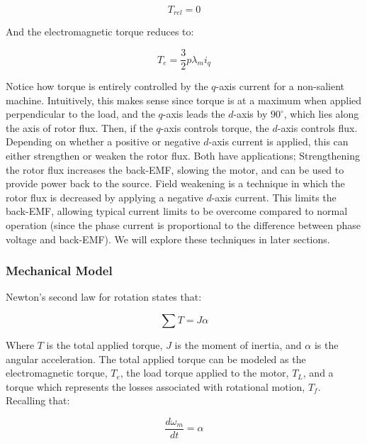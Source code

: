 \documentclass{article}
\begin{document}
\begin{equation}
    T_{rel}=0
\end{equation}

And the electromagnetic torque reduces to:

\begin{equation}
    T_e = \frac{3}{2}p\lambda_m i_q
\end{equation}

Notice how torque is entirely controlled by the $q$-axis current for a non-salient machine. Intuitively, this makes sense since torque is at a maximum when applied perpendicular to the load, and the $q$-axis leads the $d$-axis by $90^\circ$, which lies along the axis of rotor flux. Then, if the $q$-axis controls torque, the $d$-axis controls flux. Depending on whether a positive or negative $d$-axis current is applied, this can either strengthen or weaken the rotor flux. Both have applications; Strengthening the rotor flux increases the back-EMF, slowing the motor, and can be used to provide power back to the source. Field weakening is a technique in which the rotor flux is decreased by applying a negative $d$-axis current. This limits the back-EMF, allowing typical current limits to be overcome compared to normal operation (since the phase current is proportional to the difference between phase voltage and back-EMF). We will explore these techniques in later sections.


\subsubsection{Mechanical Model}

Newton's second law for rotation states that:

\begin{equation}
    \sum T = J\alpha
\end{equation}

Where $T$ is the total applied torque, $J$ is the moment of inertia, and $\alpha$ is the angular acceleration. The total applied torque can be modeled as the electromagnetic torque, $T_e$, the load torque applied to the motor, $T_L$, and a torque which represents the losses associated with rotational motion, $T_f$. Recalling that:

\begin{equation}
    \frac{d\omega_m}{dt} = \alpha
\end{equation}
\end{document}
